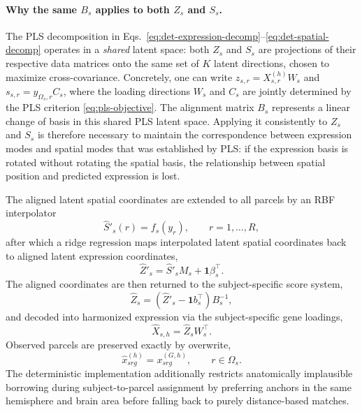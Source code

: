 \documentclass[11pt]{article}
\numberwithin{equation}{section}
\begin{document}
\paragraph{Why the same $B_s$ applies to both $Z_s$ and $S_s$.}
The PLS decomposition in Eqs.~\eqref{eq:det-expression-decomp}--\eqref{eq:det-spatial-decomp}
operates in a \emph{shared} latent space: both $Z_s$ and $S_s$ are projections of
their respective data matrices onto the same set of $K$ latent directions, chosen to
maximize cross-covariance.  Concretely, one can write
$z_{s,r} = X_{s,r}^{(h)} W_s$ and $s_{s,r} = y_{\Omega_s,r} C_s$, where the loading
directions $W_s$ and $C_s$ are jointly determined by the PLS criterion
\eqref{eq:pls-objective}.  The alignment matrix $B_s$ represents a linear change of
basis in this shared PLS latent space.  Applying it consistently to $Z_s$ and $S_s$
is therefore necessary to maintain the correspondence between expression modes and
spatial modes that was established by PLS: if the expression basis is rotated without
rotating the spatial basis, the relationship between spatial position and predicted
expression is lost.

The aligned latent spatial coordinates are extended to all parcels by an RBF
interpolator
\begin{equation}
  \label{eq:det-rbf}
  \hat{S}'_s(r) = f_s(y_r), \qquad r=1,\dots,R,
\end{equation}
after which a ridge regression maps interpolated latent spatial coordinates back to
aligned latent expression coordinates,
\begin{equation}
  \label{eq:det-ridge-regression}
  \hat{Z}'_s = \hat{S}'_s M_s + \mathbf{1}\beta_s^\top.
\end{equation}
The aligned coordinates are then returned to the subject-specific score system,
\begin{equation}
  \label{eq:det-inverse-affine}
  \hat{Z}_s = \left(\hat{Z}'_s - \mathbf{1}b_s^\top\right) B_s^{-1},
\end{equation}
and decoded into harmonized expression via the subject-specific gene loadings,
\begin{equation}
  \label{eq:det-decode}
  \hat{X}_{s,h} = \hat{Z}_s W_s^\top.
\end{equation}
Observed parcels are preserved exactly by overwrite,
\begin{equation}
  \label{eq:det-overwrite}
  \hat{x}_{srg}^{(h)} = x_{srg}^{(G,h)}, \qquad r\in\Omega_s.
\end{equation}
The deterministic implementation additionally restricts anatomically implausible
borrowing during subject-to-parcel assignment by preferring anchors in the same
hemisphere and brain area before falling back to purely distance-based matches.
\end{document}
